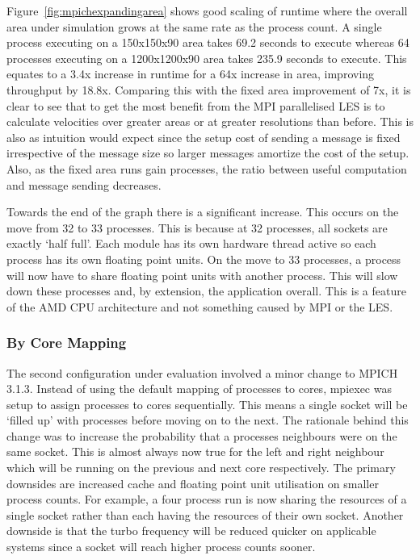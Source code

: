 Figure~\ref{fig:mpichexpandingarea} shows good scaling of runtime where the
overall area under simulation grows at the same rate as the process count. A
single process executing on a 150x150x90 area takes 69.2 seconds to execute
whereas 64 processes executing on a 1200x1200x90 area takes 235.9 seconds to
execute. This equates to a 3.4x increase in runtime for a 64x increase in area,
improving throughput by 18.8x. Comparing this with the fixed area improvement of
7x, it is clear to see that to get the most benefit from the MPI parallelised
LES is to calculate velocities over greater areas or at greater resolutions than
before. This is also as intuition would expect since the setup cost of sending a
message is fixed irrespective of the message size so larger messages amortize
the cost of the setup. Also, as the fixed area runs gain processes, the ratio
between useful computation and message sending decreases.

Towards the end of the graph there is a significant increase. This occurs on the
move from 32 to 33 processes. This is because at 32 processes, all sockets are
exactly `half full'. Each module has its own hardware thread active so each
process has its own floating point units. On the move to 33 processes, a process
will now have to share floating point units with another process. This will slow
down these processes and, by extension, the application overall. This is a
feature of the AMD CPU architecture and not something caused by MPI or the LES.

\subsubsection{By Core Mapping}

The second configuration under evaluation involved a minor change to MPICH
3.1.3. Instead of using the default mapping of processes to cores, mpiexec was
setup to assign processes to cores sequentially. This means a single socket will
be `filled up' with processes before moving on to the next. The rationale behind
this change was to increase the probability that a processes neighbours were on
the same socket. This is almost always now true for the left and right neighbour
which will be running on the previous and next core respectively. The primary
downsides are increased cache and floating point unit utilisation on smaller
process counts. For example, a four process run is now sharing the resources of
a single socket rather than each having the resources of their own socket.
Another downside is that the turbo frequency will be reduced quicker on
applicable systems since a socket will reach higher process counts sooner.

